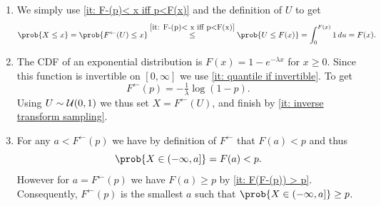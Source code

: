 \begin{solution}
\begin{enumerate}[wide=0pt]
    \item[\ref{it: inverse transform sampling}]
    We simply use \ref{it: F-(p)< x iff p<F(x)} and the definition of \(U\) to get
    \[
        \prob{X \le x}
        = \prob{F^{\leftarrow}(U) \le x}
        \overset{\ref{it: F-(p)< x iff p<F(x)}}\le \prob{U \le F(x)}
        = \int_0^{F(x)} 1 \, du
        = F(x).
    \]

    \item[\ref{it: simulate exponential rvs}]
    The CDF of an exponential distribution is \(F(x) = 1 - e^{-\lambda x}\) for \(x \ge 0\).
    Since this function is invertible on \([0, \infty]\) we use
    \ref{it: quantile if invertible}. To get
    \[
        F^{\leftarrow}(p) = -\tfrac{1}{\lambda} \log(1-p).
    \]
    Using \(U \sim \mathcal{U}(0,1)\) we thus set \(X = F^{\leftarrow}(U)\),
    and finish by \ref{it: inverse transform sampling}.

    \item[\ref{it: quantiles}]
    For any \(a < F^{\leftarrow}(p)\) we have by definition of \(F^{\leftarrow}\) that
    \(F(a) < p\) and thus
    \[
        \prob{X \in (-\infty, a]} = F(a) < p.
    \]
    However for \(a=F^{\leftarrow}(p)\) we have \(F(a)\ge p\) by
    \ref{it: F(F-(p)) > p}.  Consequently, \(F^{\leftarrow}(p)\) is the
    smallest \(a\) such that \(\prob{X \in (-\infty, a]} \ge p\).
    \qedhere
\end{enumerate}
\end{solution}
